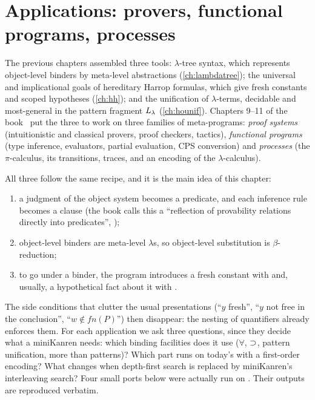 \chapter{Applications: provers, functional programs, processes}\label{ch:apps}

The previous chapters assembled three tools: $\lambda$-tree syntax, which represents object-level binders
by meta-level abstractions (\cref{ch:lambdatree}); the universal and implicational goals of hereditary
Harrop formulas, which give fresh constants and scoped hypotheses (\cref{ch:hh}); and the unification of
$\lambda$-terms, decidable and most-general in the pattern fragment $L_\lambda$ (\cref{ch:hounif}). Chapters
9--11 of the book~\cite{MillerNadathur2012} put the three to work on three families of meta-programs:
\emph{proof systems} (intuitionistic and classical provers, proof checkers, tactics),
\emph{functional programs} (type inference, evaluators, partial evaluation, CPS conversion) and
\emph{processes} (the $\pi$-calculus, its transitions, traces, and an encoding of the $\lambda$-calculus).

All three follow the same recipe, and it is the main idea of this chapter:

\begin{enumerate}[nosep]
  \item a judgment of the object system becomes a predicate, and each inference rule becomes a clause
        (the book calls this a ``reflection of provability relations directly into predicates'', );
  \item object-level binders are meta-level $\lambda$s, so object-level substitution is $\beta$-reduction;
  \item to go under a binder, the program introduces a fresh constant with  and, usually, a
        hypothetical fact about it with \lp{=>}.
\end{enumerate}

\noindent The side conditions that clutter the usual presentations (``$y$ fresh'', ``$y$ not free in the
conclusion'', ``$w\notin fn(P)$'') then disappear: the nesting of quantifiers already enforces them. For
each application we ask three questions, since they decide what a miniKanren needs: which binding
facilities does it use ($\forall$, $\supset$, pattern unification, more than patterns)? Which part runs on
today's \micro{} with a first-order encoding? What changes when depth-first search is replaced by
miniKanren's interleaving search? Four small ports below were actually run on \micro{}. Their outputs
are reproduced verbatim.

